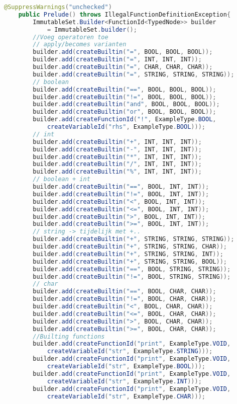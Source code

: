 \begin{lstlisting}[language=Java]
	@SuppressWarnings("unchecked")
	public Prelude() throws IllegalFunctionDefinitionException{
		ImmutableSet.Builder<FunctionId<TypedNode>> builder 
            = ImmutableSet.builder();
		//Voeg operatoren toe
		// apply/becomes varianten
		builder.add(createBuiltin("=", BOOL, BOOL, BOOL));
		builder.add(createBuiltin("=", INT, INT, INT));
		builder.add(createBuiltin("=", CHAR, CHAR, CHAR));
		builder.add(createBuiltin("=", STRING, STRING, STRING));
		// boolean
		builder.add(createBuiltin("==", BOOL, BOOL, BOOL));
		builder.add(createBuiltin("!=", BOOL, BOOL, BOOL));
		builder.add(createBuiltin("and", BOOL, BOOL, BOOL));
		builder.add(createBuiltin("or", BOOL, BOOL, BOOL));
		builder.add(createFunctionId("!", ExampleType.BOOL, 
            createVariableId("rhs", ExampleType.BOOL)));
		// int
		builder.add(createBuiltin("+", INT, INT, INT));
		builder.add(createBuiltin("-", INT, INT, INT));
		builder.add(createBuiltin("*", INT, INT, INT));
		builder.add(createBuiltin("/", INT, INT, INT));
		builder.add(createBuiltin("%", INT, INT, INT));
		// boolean + int
		builder.add(createBuiltin("==", BOOL, INT, INT));
		builder.add(createBuiltin("!=", BOOL, INT, INT));
		builder.add(createBuiltin("<", BOOL, INT, INT));
		builder.add(createBuiltin("<=", BOOL, INT, INT));
		builder.add(createBuiltin(">", BOOL, INT, INT));
		builder.add(createBuiltin(">=", BOOL, INT, INT));
		// string -> tijdelijk met +..
		builder.add(createBuiltin("+", STRING, STRING, STRING));
		builder.add(createBuiltin("+", STRING, STRING, CHAR));
		builder.add(createBuiltin("+", STRING, STRING, INT));
		builder.add(createBuiltin("+", STRING, STRING, BOOL));
		builder.add(createBuiltin("==", BOOL, STRING, STRING));
		builder.add(createBuiltin("!=", BOOL, STRING, STRING));
		// char
		builder.add(createBuiltin("==", BOOL, CHAR, CHAR));
		builder.add(createBuiltin("!=", BOOL, CHAR, CHAR));
		builder.add(createBuiltin("<", BOOL, CHAR, CHAR));
		builder.add(createBuiltin("<=", BOOL, CHAR, CHAR));
		builder.add(createBuiltin(">", BOOL, CHAR, CHAR));
		builder.add(createBuiltin(">=", BOOL, CHAR, CHAR));
		//Builting functions
		builder.add(createFunctionId("print", ExampleType.VOID, 	
            createVariableId("str", ExampleType.STRING)));
		builder.add(createFunctionId("print", ExampleType.VOID, 	
            createVariableId("str", ExampleType.BOOL)));
		builder.add(createFunctionId("print", ExampleType.VOID, 	
            createVariableId("str", ExampleType.INT)));
		builder.add(createFunctionId("print", ExampleType.VOID, 	
            createVariableId("str", ExampleType.CHAR)));
		

\end{lstlisting}

